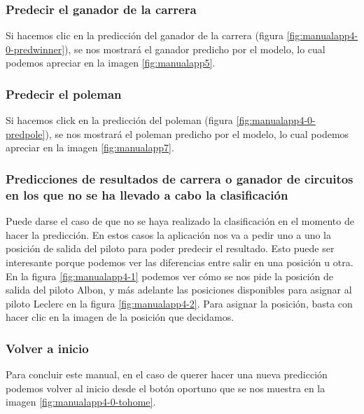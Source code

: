\subsubsection{Predecir el ganador de la carrera}

Si hacemos clic en la predicción del ganador de la carrera (figura \ref{fig:manualapp4-0-predwinner}), se nos mostrará el ganador predicho por el modelo, lo cual podemos apreciar en la imagen \ref{fig:manualapp5}.



\subsubsection{Predecir el poleman}

Si hacemos click en la predicción del poleman (figura \ref{fig:manualapp4-0-predpole}), se nos mostrará el poleman predicho por el modelo, lo cual podemos apreciar en la imagen \ref{fig:manualapp7}.



\subsubsection{Predicciones de resultados de carrera o ganador de circuitos en los que no se ha llevado a cabo la clasificación}

Puede darse el caso de que no se haya realizado la clasificación en el momento de hacer la predicción. En estos casos la aplicación nos va a pedir uno a uno la posición de salida del piloto para poder predecir el resultado. Esto puede ser interesante porque podemos ver las diferencias entre salir en una posición u otra. En la figura \ref{fig:manualapp4-1} podemos ver cómo se nos pide la posición de salida del piloto Albon, y más adelante las posiciones disponibles para asignar al piloto Leclerc en la figura \ref{fig:manualapp4-2}. Para asignar la posición, basta con hacer clic en la imagen de la posición que decidamos.


\subsubsection{Volver a inicio}

Para concluir este manual, en el caso de querer hacer una nueva predicción podemos volver al inicio desde el botón oportuno que se nos muestra en la imagen \ref{fig:manualapp4-0-tohome}.

